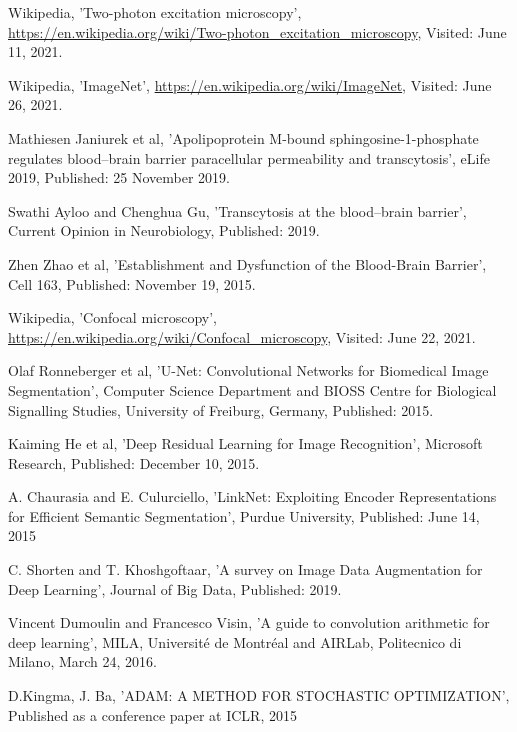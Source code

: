 \begin{thebibliography}{9}
	Wikipedia, 'Two-photon excitation microscopy', \url{https://en.wikipedia.org/wiki/Two-photon_excitation_microscopy}, Visited: June 11, 2021.
	
	Wikipedia, 'ImageNet', \url{https://en.wikipedia.org/wiki/ImageNet}, Visited: June 26, 2021.
	
	Mathiesen Janiurek et al, 'Apolipoprotein M-bound sphingosine-1-phosphate regulates blood–brain barrier paracellular permeability and transcytosis', eLife 2019, Published: 25 November 2019.

	Swathi Ayloo and Chenghua Gu, 'Transcytosis at the blood–brain barrier', Current Opinion in Neurobiology, Published: 2019.

	Zhen Zhao et al, 'Establishment and Dysfunction of the Blood-Brain Barrier', Cell 163, Published: November 19, 2015.
	
	Wikipedia, 'Confocal microscopy', \url{https://en.wikipedia.org/wiki/Confocal_microscopy}, Visited: June 22, 2021.
	
	Olaf Ronneberger et al, 'U-Net: Convolutional Networks for Biomedical Image Segmentation', Computer Science Department and BIOSS Centre for Biological Signalling Studies,
	University of Freiburg, Germany, Published: 2015.
	
	Kaiming He et al, 'Deep Residual Learning for Image Recognition', Microsoft Research, Published: December 10, 2015.
	
	A. Chaurasia and E. Culurciello, 'LinkNet: Exploiting Encoder Representations for Efficient Semantic Segmentation', Purdue University, Published: June 14, 2015
	
	C. Shorten and T. Khoshgoftaar, 'A survey on Image Data Augmentation for Deep Learning', Journal of Big Data, Published: 2019.
	
	Vincent Dumoulin and Francesco Visin, 'A guide to convolution arithmetic for deep learning', MILA, Université de Montréal and AIRLab, Politecnico di Milano, March 24, 2016.
	
	D.Kingma, J. Ba, 'ADAM: A METHOD FOR STOCHASTIC OPTIMIZATION', Published as a conference paper at ICLR, 2015
\end{thebibliography}